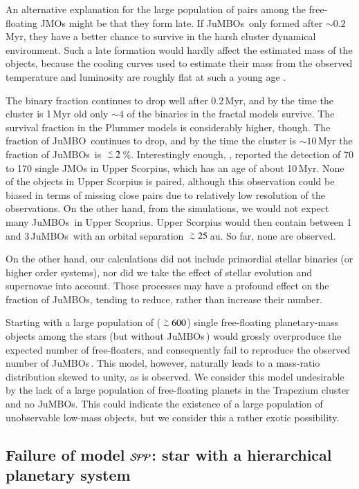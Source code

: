 \documentclass[submission,phys]{lib/SciPost}
\def\apgt{\ {\raise-.5ex\hbox{$\buildrel>\over\sim$}}\ }
\def\aplt{\ {\raise-.5ex\hbox{$\buildrel<\over\sim$}}\ }
\newcommand{\jumbo}{\mbox{JuMBO}}
\newcommand{\jumbos}{\mbox{JuMBOs}}
\begin{document}
An alternative explanation for the large population of pairs among the
free-floating JMOs might be that they form late.  If \jumbos\, only
formed after $\sim 0.2$\,Myr, they have a better chance to survive in
the harsh cluster dynamical environment.  Such a late formation would
hardly affect the estimated mass of the objects, because the cooling
curves used to estimate their mass from the observed temperature and
luminosity are roughly flat at such a young age
\cite{2000MNRAS.314..858L}.

The binary fraction continues to drop well after 0.2\,Myr, and by the
time the cluster is 1\,Myr old only $\sim 4$ of the binaries in the
fractal models survive. The survival fraction in the Plummer models is
considerably higher, though. The fraction of \jumbo\, continues to
drop, and by the time the cluster is $\sim 10$\,Myr the fraction of
\jumbos\ is $\aplt 2$\,\%.  Interestingly enough,
\cite{2022NatAs...6...89M}, reported the detection of 70 to 170 single
JMOs in Upper Scorpius, which has an age of about
10\,Myr.  None of the objects in Upper Scorpius is paired, although
this observation could be biased in terms of missing close pairs due
to relatively low resolution of the observations.  On the other hand,
from the simulations, we would not expect many \jumbos\, in Upper
Scoprius. Upper Scorpius would then contain between 1
and 3\,\jumbos\, with an orbital separation $\apgt 25$\,au. So far,
none are observed.

On the other hand, our calculations did not include primordial
stellar binaries (or higher order systems), nor did we take the effect
of stellar evolution and supernovae into account. Those processes may
have a profound effect on the fraction of \jumbos, tending to reduce,
rather than increase their number.

Starting with a large population of ($\apgt 600$) single free-floating
planetary-mass objects among the stars (but without \jumbos\,) would
grossly overproduce the expected number of free-floaters, and
consequently fail to reproduce the observed number of \jumbos\,.  This
model, however, naturally leads to a mass-ratio distribution skewed to
unity, as is observed. We consider this model undesirable by the lack
of a large population of free-floating planets in the Trapezium
cluster and no \jumbos. This could indicate the existence of a large
population of unobservable low-mass objects, but we consider this a
rather exotic possibility.

\subsection{Failure of model ${\cal SPP}$: star with a hierarchical planetary system}\label{Sect:Failure_SPP}
\end{document}
